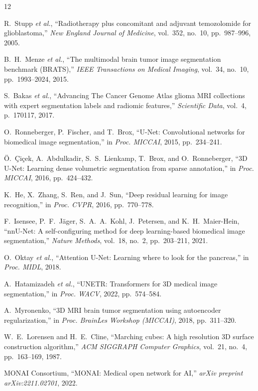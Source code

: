 \documentclass[conference]{IEEEtran}
\begin{document}
\begin{thebibliography}{12}

R.~Stupp \textit{et al.},
``Radiotherapy plus concomitant and adjuvant temozolomide for glioblastoma,''
\textit{New England Journal of Medicine}, vol.~352, no.~10,
pp.~987--996, 2005.

B.~H.~Menze \textit{et al.},
``The multimodal brain tumor image segmentation benchmark (BRATS),''
\textit{IEEE Transactions on Medical Imaging}, vol.~34, no.~10,
pp.~1993--2024, 2015.

S.~Bakas \textit{et al.},
``Advancing The Cancer Genome Atlas glioma MRI collections with expert
segmentation labels and radiomic features,''
\textit{Scientific Data}, vol.~4, p.~170117, 2017.

O.~Ronneberger, P.~Fischer, and T.~Brox,
``U-Net: Convolutional networks for biomedical image segmentation,''
in \textit{Proc. MICCAI}, 2015, pp.~234--241.

\"{O}.~\c{C}i\c{c}ek, A.~Abdulkadir, S.~S.~Lienkamp, T.~Brox,
and O.~Ronneberger,
``3D U-Net: Learning dense volumetric segmentation from sparse annotation,''
in \textit{Proc. MICCAI}, 2016, pp.~424--432.

K.~He, X.~Zhang, S.~Ren, and J.~Sun,
``Deep residual learning for image recognition,''
in \textit{Proc. CVPR}, 2016, pp.~770--778.

F.~Isensee, P.~F.~J\"{a}ger, S.~A.~A.~Kohl, J.~Petersen,
and K.~H.~Maier-Hein,
``nnU-Net: A self-configuring method for deep learning-based biomedical
image segmentation,''
\textit{Nature Methods}, vol.~18, no.~2, pp.~203--211, 2021.

O.~Oktay \textit{et al.},
``Attention U-Net: Learning where to look for the pancreas,''
in \textit{Proc. MIDL}, 2018.

A.~Hatamizadeh \textit{et al.},
``UNETR: Transformers for 3D medical image segmentation,''
in \textit{Proc. WACV}, 2022, pp.~574--584.

A.~Myronenko,
``3D MRI brain tumor segmentation using autoencoder regularization,''
in \textit{Proc. BrainLes Workshop (MICCAI)}, 2018, pp.~311--320.

W.~E.~Lorensen and H.~E.~Cline,
``Marching cubes: A high resolution 3D surface construction algorithm,''
\textit{ACM SIGGRAPH Computer Graphics}, vol.~21, no.~4,
pp.~163--169, 1987.

MONAI Consortium,
``MONAI: Medical open network for AI,''
\textit{arXiv preprint arXiv:2211.02701}, 2022.

\end{thebibliography}
\end{document}
